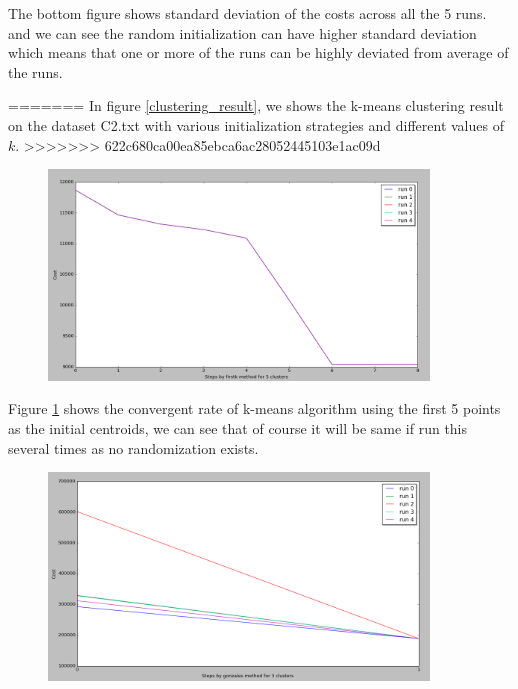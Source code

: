 The bottom figure shows standard deviation of the costs across all the 5 runs. and we can see the random initialization can have higher standard deviation which means that one or more of the runs can be highly deviated from average of the runs.


 














=======
In figure \ref{clustering_result}, we shows the k-means clustering result on the dataset C2.txt with various initialization strategies and different values of $k$.
>>>>>>> 622c680ca00ea85ebca6ac28052445103e1ac09d





\begin{figure}[!htb]
\centering
\includegraphics[width=0.9\textwidth]{shots/firstk5clusters.png}
\caption{ }
\label{firstk5clusters}
\end{figure}


Figure \ref{firstk5clusters} shows the convergent rate of k-means algorithm using the first 5 points as the initial centroids, we can see that of course it will be same if run this several times as no randomization exists.


\begin{figure}[!htb]
\centering
\includegraphics[width=0.9\textwidth]{shots/gonzales3clusters.png}
\caption{ }
\label{gonzales3clusters}
\end{figure}

